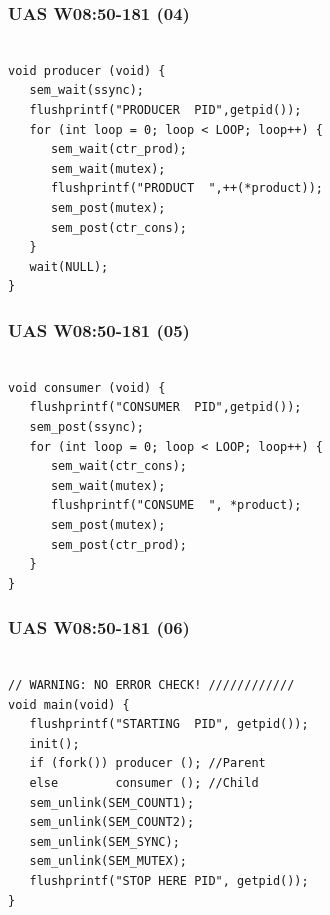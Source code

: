 \documentclass[xcolor=table, notheorems, hyperref={pdfpagelabels=false}]{beamer}
\begin{document}
\begin{frame}[fragile]
\frametitle{UAS W08:50-181 (04)}
\begin{lstlisting}[basicstyle=\ttfamily\large]        %  54

void producer (void) {
   sem_wait(ssync);
   flushprintf("PRODUCER  PID",getpid());
   for (int loop = 0; loop < LOOP; loop++) {
      sem_wait(ctr_prod);
      sem_wait(mutex);
      flushprintf("PRODUCT  ",++(*product));
      sem_post(mutex);
      sem_post(ctr_cons);
   }
   wait(NULL);
}

\end{lstlisting}
\end{frame}

\begin{frame}[fragile]
\frametitle{UAS W08:50-181 (05)}
\begin{lstlisting}[basicstyle=\ttfamily\large]        %  54

void consumer (void) {
   flushprintf("CONSUMER  PID",getpid());
   sem_post(ssync);
   for (int loop = 0; loop < LOOP; loop++) {
      sem_wait(ctr_cons);
      sem_wait(mutex);
      flushprintf("CONSUME  ", *product);
      sem_post(mutex);
      sem_post(ctr_prod);
   }
}

\end{lstlisting}
\end{frame}

\begin{frame}[fragile]
\frametitle{UAS W08:50-181 (06)}
\begin{lstlisting}[basicstyle=\ttfamily\large]        %  54

// WARNING: NO ERROR CHECK! ////////////
void main(void) {
   flushprintf("STARTING  PID", getpid());
   init();
   if (fork()) producer (); //Parent
   else        consumer (); //Child
   sem_unlink(SEM_COUNT1);
   sem_unlink(SEM_COUNT2);
   sem_unlink(SEM_SYNC);
   sem_unlink(SEM_MUTEX);
   flushprintf("STOP HERE PID", getpid());
}

\end{lstlisting}
\end{frame}
\end{document}
